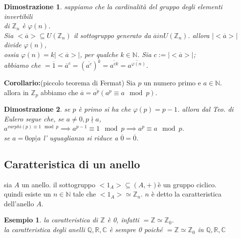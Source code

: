 \documentclass[a4paper,12pt]{article}
\theoremstyle{def}
\theoremstyle{prop}
\theoremstyle{esempio}
\newtheorem*{example}{Esempio}
\theoremstyle{dimostrazione}
\newtheorem*{dimostrazione}{Dimostrazione}
\theoremstyle{teo}
\theoremstyle{osservazione}
\begin{document}
\begin{dimostrazione}
	sappiamo che la cardinalità del gruppo degli elementi invertibili \\
	di \(\mathbb{Z}_n\) è \(\varphi(n)\).\\
	Sia \(<\overline{a}> \subseteq U(\mathbb{Z}_n)\) il sottogruppo generato da \(\overline{a} in U(\mathbb{Z}_n)\). allora \(|<\overline{a}>|\) divide \(\varphi(n)\),\\
	ossia \(\varphi(n) = k |<\overline{a}>|\), per qualche \(k \in \mathbb{N}\). Sia \(c := |<\overline{a}>|\);\\
	abbiamo che \( = \overline{1} = \overline{a}^c = (\overline{a^c})^k  = \overline{a^{ck}} = \overline{a^{\varphi(n)}} \).\\
\end{dimostrazione}

\textbf{Corollario:}(piccolo teorema di Fermat) Sia \(p\) un numero primo e \(a \in \mathbb{N}\).\\
allora in \(\mathbb{Z}_p\) abbiamo che \(\overline{a} = \overline{a^p} (a^p \equiv a \mod p)\).\\

\begin{dimostrazione}
	se \(p\) è primo si ha che \(\varphi(p) = p-1\). allora dal Teo. di Eulero segue che, se \(a \neq 0, p \nmid a\), \(a^{varphi(p) \equiv 1 \mod p}\implies a ^{p-1} \equiv 1 \mod p \implies a^p \equiv a \mod p\).\\
	se \(a = 0 o p | a\) l' uguaglianza si riduce a \(\overline{0} = \overline{0}\).
\end{dimostrazione}

\newpage

\subsection{Caratteristica di un anello}
sia \(A\) un anello. il sottogruppo \(<1_A> \subseteq (A,+)\)è un gruppo ciclico.\\
quindi esiste un \(n \in \mathbb{N}\) tale che \(<1_A> \simeq \mathbb{Z}_n\). \(n\) è detto la caratteristica dell'anello \(A\).\\

\begin{example}
	la caratteristica di \(\mathbb{Z}\) è 0, infatti \(<1> = \mathbb{Z} \simeq \mathbb{Z}_0\).\\
	la caratteristica degli anelli \(\mathbb{Q},\mathbb{R},\mathbb{C}\) è sempre 0 poiché \(<1> = \mathbb{Z} \simeq \mathbb{Z}_0\) in  \(\mathbb{Q},\mathbb{R},\mathbb{C}\)\\
\end{example}
\end{document}
